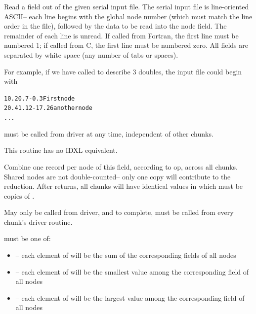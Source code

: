 \documentclass[10pt]{article}
\begin{document}

     Read a field out of the given serial input file.  The serial input
     file is line-oriented ASCII-- each line begins with the global
     node number (which must match the line order in the file),
     followed by the data to be read into the node field.  The
     remainder of each line is unread.  If called from Fortran, the
     first line must be numbered 1; if called from C, the first line
     must be numbered zero.  All fields are separated by white space
     (any number of tabs or spaces).

     For example, if we have called  to describe 3 doubles,
     the input file could begin with

\begin{alltt}
          1    0.2    0.7    -0.3      First node
          2    0.4    1.12   -17.26    another node
          ...
\end{alltt}

      must be called from driver at any time, independent
     of other chunks. 
     
     This routine has no IDXL equivalent.


Combine one record per node of this field, according to op, across all chunks.
Shared nodes are not double-counted-- only one copy will contribute to the
reduction.  After  returns, all chunks will have identical
values in  which must be  copies of .

     May only be called from driver, and to complete, must be called
     from every chunk's driver routine.

      must be one of:

\begin{itemize}
        \item {}-- each element of  will be the sum 
of the corresponding fields of all nodes
        \item {}-- each element of  will be the 
smallest value among the corresponding field of all nodes
        \item {}-- each element of  will be the largest 
value among the corresponding field of all nodes
\end{itemize}
\end{document}
